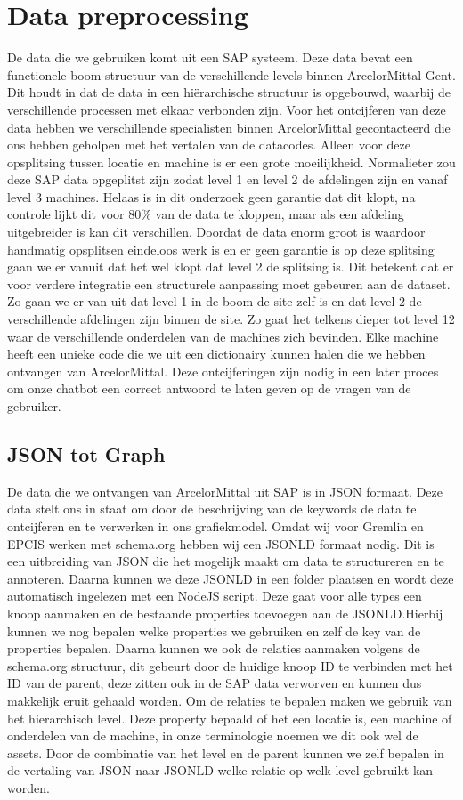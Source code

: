 \section{Data preprocessing}
De data die we gebruiken komt uit een SAP systeem. Deze data bevat een functionele boom structuur van de verschillende levels binnen ArcelorMittal Gent.
Dit houdt in dat de data in een hiërarchische structuur is opgebouwd, waarbij de verschillende processen met elkaar verbonden zijn.
Voor het ontcijferen van deze data hebben we verschillende specialisten binnen ArcelorMittal gecontacteerd die ons hebben geholpen met het vertalen van de datacodes.
Alleen voor deze opsplitsing tussen locatie en machine is er een grote moeilijkheid. Normalieter zou deze SAP data opgeplitst zijn zodat level 1 en level 2 de afdelingen zijn en vanaf level 3 machines. 
Helaas is in dit onderzoek geen garantie dat dit klopt, na controle lijkt dit voor 80\% van de data te kloppen, maar als een afdeling uitgebreider is kan dit verschillen.
Doordat de data enorm groot is waardoor handmatig opsplitsen eindeloos werk is en er geen garantie is op deze splitsing gaan we er vanuit dat het wel klopt dat level 2 de splitsing is. 
Dit betekent dat er voor verdere integratie een structurele aanpassing moet gebeuren aan de dataset.
Zo gaan we er van uit dat level 1 in de boom de site zelf is en dat level 2 de verschillende afdelingen zijn binnen de site. Zo gaat het telkens dieper tot level 12 waar de verschillende onderdelen van de machines zich bevinden.
Elke machine heeft een unieke code die we uit een dictionairy kunnen halen die we hebben ontvangen van ArcelorMittal.
Deze ontcijferingen zijn nodig in een later proces om onze chatbot een correct antwoord te laten geven op de vragen van de gebruiker.

\subsection{JSON tot Graph}
De data die we ontvangen van ArcelorMittal uit SAP is in JSON formaat. Deze data stelt ons in staat om door de beschrijving van de keywords de data te ontcijferen en te verwerken in ons grafiekmodel.
Omdat wij voor Gremlin en EPCIS werken met schema.org hebben wij een JSON\-LD formaat nodig. Dit is een uitbreiding van JSON die het mogelijk maakt om data te structureren en te annoteren.
Daarna kunnen we deze JSON\-LD in een folder plaatsen en wordt deze automatisch ingelezen met een NodeJS script.
Deze gaat voor alle types een knoop aanmaken en de bestaande properties toevoegen aan de JSON\-LD.\@ Hierbij kunnen we nog bepalen welke properties we gebruiken en zelf de key van de properties bepalen.
Daarna kunnen we ook de relaties aanmaken volgens de schema.org structuur, dit gebeurt door de huidige knoop ID te verbinden met het ID van de parent, deze zitten ook in de SAP data verworven en kunnen dus makkelijk eruit gehaald worden.
Om de relaties te bepalen maken we gebruik van het hierarchisch level. Deze property bepaald of het een locatie is, een machine of onderdelen van de machine, in onze terminologie noemen we dit ook wel de assets.
Door de combinatie van het level en de parent kunnen we zelf bepalen in de vertaling van JSON naar JSON\-LD welke relatie op welk level gebruikt kan worden.

